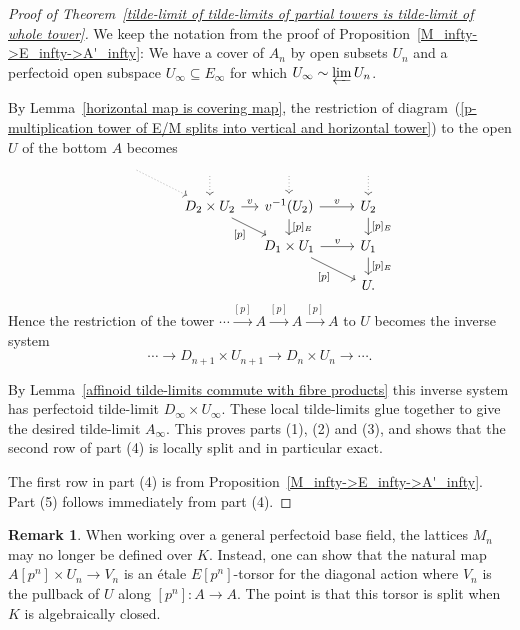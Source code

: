 \documentclass[10pt,oneside]{amsart}
\theoremstyle{definition}
\newtheorem{remark}[theorem]{Remark}
\begin{document}
	\begin{proof}[Proof of Theorem~\ref{tilde-limit of tilde-limits of partial towers is tilde-limit of whole tower}]
We keep the notation from the proof of Proposition~\ref{M_infty->E_infty->A'_infty}: We have a cover of $A_n$ by open subsets $U_n$ and a  perfectoid open subspace $U_\infty\subseteq E_\infty$ for which $U_\infty\sim \varprojlim U_n$.
	 
By Lemma~\ref{horizontal map is covering map}, the restriction of diagram~(\ref{p-multiplication tower of E/M splits into vertical and horizontal tower}) to the open $U$ of the bottom $A$ becomes
\begin{equation*}
		\begin{tikzcd}[row sep={1cm,between origins},column sep={2.0cm,between origins}]
{} \arrow[rd, dotted] & {} \arrow[d, dotted]           & {} \arrow[d, dotted]           & {} \arrow[d, dotted]    \\
& D_2\times U_2 \arrow[r,"v"] \arrow[rd,"{[p]}"'] & {v^{-1}(U_2)} \arrow[d,"{[p]_E}"] \arrow[r,"v"]  & { U_2} \arrow[d,"{[p]_E}"]     \\
&                                &  D_1\times U_1\arrow[r,"v"] \arrow[rd,"{[p]}"'] & { U_1} \arrow[d, ,"{[p]_E}"] \\
&                                &                                & {U.}              
\end{tikzcd}
\end{equation*}
Hence the restriction of the tower $\cdots\xrightarrow{[p]}A \xrightarrow{[p]}A\xrightarrow{[p]}A$ to $U$ becomes the inverse system 
	 \[\cdots\rightarrow D_{n+1}\times U_{n+1}\rightarrow D_{n}\times U_n\rightarrow \cdots.\]
	
	By Lemma~\ref{affinoid tilde-limits commute with fibre products} this inverse system has perfectoid tilde-limit $D_\infty \times U_\infty$. These local tilde-limits glue together to give the desired tilde-limit $A_\infty$. This proves parts (1), (2) and (3), and shows that the second row of part (4) is locally split and in particular exact.
	
	The first row in part (4) is from Proposition~\ref{M_infty->E_infty->A'_infty}. Part (5) follows immediately from part (4).
	\end{proof}
	\begin{remark}
		When working over a general perfectoid base field, the lattices $M_n$ may no longer be defined over $K$. Instead, one can show that the natural map $A[p^n]\times U_n\to V_n$ is an \'etale $E[p^n]$-torsor for the diagonal action where $V_n$ is the pullback of $U$ along $[p^n]\colon A\to A$. The point is that this torsor is split when $K$ is algebraically closed.
	\end{remark}
\end{document}
